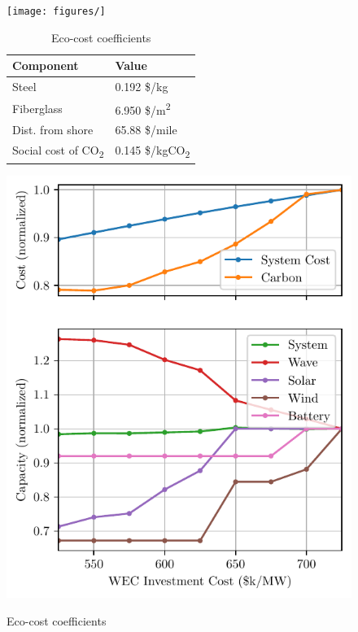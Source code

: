 \documentclass[10pt,twoside]{article}
\newif\ifplaceholder
\let\originalincludegraphics\includegraphics
\renewcommand{\includegraphics}[2][]{%
  \ifplaceholder
    \begin{tikzpicture}
      \node[anchor=south west, inner sep=0] (img) at (0,0) {\originalincludegraphics[#1]{#2}};
      \node at ($(img.south east)!0.5!(img.north west)$)
        [fill=white,opacity=0.8,text=red,font=\huge] {Placeholder};
    \end{tikzpicture}
    \vspace{-\baselineskip}
  \else
    \originalincludegraphics[#1]{#2}%
  \fi
  \placeholderfalse %
}
\begin{document}
\begin{figure}[b]
\noindent
\begin{minipage}[b]{0.32\textwidth}
    \centering
    \texttt{[image: figures/]}
    \label{fig:five}
\end{minipage}
\hfill
\begin{minipage}[b]{0.34\textwidth}
    \begin{table}[H]
    \begin{tabular}{ ll } 
        \hline
        Component & Value \\ 
        \hline
        Steel & 0.192 \$/kg \\ 
        Fiberglass & 6.950 \$/m\textsuperscript{2} \\ 
        Dist. from shore & 65.88 \$/mile \\ 
        Social cost of CO\textsubscript{2} & 0.145 \$/kgCO\textsubscript{2} \\
    \end{tabular}
    \caption{Eco-cost coefficients}
    \label{tab:lca-weights}
    \end{table}
\end{minipage}
\hfill
\begin{minipage}[b]{0.32\textwidth}
    \centering
    \includegraphics[width=\linewidth]{figures/CEM_cost_sweep.pdf}
    \label{fig:four}
\end{minipage}
\end{figure}
\end{document}
